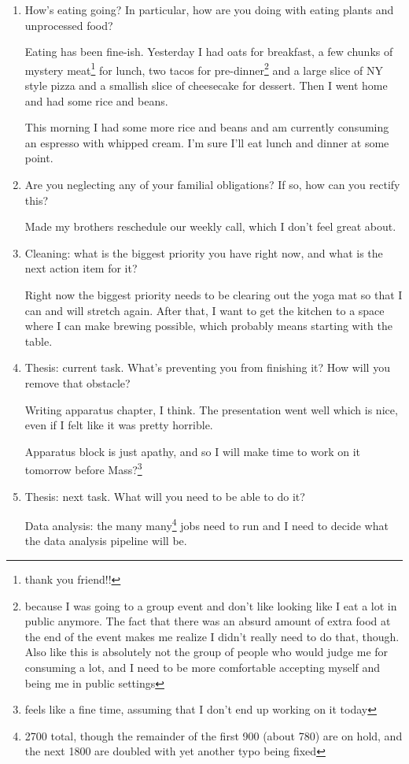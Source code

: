 \documentclass[12pt]{article}
\renewcommand{\,}{\textsuperscript{,}}
\begin{document}
\begin{enumerate}
\item How's eating going? In particular, how are you doing with eating plants and unprocessed food?

Eating has been fine-ish. Yesterday I had oats for breakfast, a few chunks of mystery meat\footnote{thank you friend!!} for lunch, two tacos for pre-dinner\footnote{because I was going to a group event and don't like looking like I eat a lot in public anymore. The fact that there was an absurd amount of extra food at the end of the event makes me realize I didn't really need to do that, though. Also like this is absolutely not the group of people who would judge me for consuming a lot, and I need to be more comfortable accepting myself and being me in public settings} and a large slice of NY style pizza and a smallish slice of cheesecake for dessert. Then I went home and had some rice and beans.

This morning I had some more rice and beans and am currently consuming an espresso with whipped cream.  
I'm sure I'll eat lunch and dinner at some point.

\item Are you neglecting any of your familial obligations? If so, how can you rectify this?

Made my brothers reschedule our weekly call, which I don't feel great about.

\item Cleaning: what is the biggest priority you have right now, and what is the next action item for it?

Right now the biggest priority needs to be clearing out the yoga mat so that I can and will stretch again.  
After that, I want to get the kitchen to a space where I can make brewing possible, which probably means starting with the table.

\item Thesis: current task. What's preventing you from finishing it? How will you remove that obstacle?

Writing apparatus chapter, I think.  
The presentation went well which is nice, even if I felt like it was pretty horrible.

Apparatus block is just apathy, and so I will make time to work on it tomorrow before Mass?\footnote{feels like a fine time, assuming that I don't end up working on it today}

\item Thesis: next task. What will you need to be able to do it?

Data analysis: the many many\footnote{2700 total, though the remainder of the first 900 (about 780) are on hold, and the next 1800 are doubled with yet another typo being fixed} jobs need to run and I need to decide what the data analysis pipeline will be.


\end{enumerate}
\end{document}
